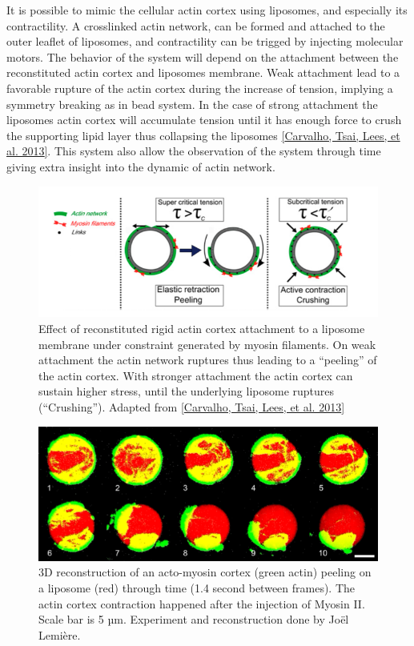 \documentclass[A4paperpaper,11pt,english]{sphinxmanual}
\begin{document}
It is possible to mimic the cellular actin cortex using liposomes, and especially
its contractility. A crosslinked actin network, can be formed and attached to
the outer leaflet of liposomes, and contractility can be trigged by injecting
molecular motors. The behavior of the system will depend on the attachment
between the reconstituted actin cortex and liposomes membrane.  Weak attachment
lead to a favorable rupture of the actin cortex during the increase of tension,
implying a symmetry breaking as in bead system.  In the case of strong
attachment the liposomes actin cortex will accumulate tension until it has
enough force to crush the supporting lipid layer thus collapsing the liposomes
{\hyperref[parts/part1:carvalho2013]{{[}Carvalho, Tsai, Lees,  et al.  2013{]}}}. This system also allow the observation of the system
through time giving extra insight into the dynamic of actin network.
\begin{figure}[htbp]
\centering
\capstart

\includegraphics[width=0.800\linewidth]{joel-2-11.png}
\caption{Effect of reconstituted rigid actin cortex attachment to a liposome
membrane under constraint generated by myosin filaments. On weak attachment
the actin network ruptures thus leading to a ``peeling'' of the actin cortex.
With stronger attachment the actin cortex can sustain higher stress, until
the underlying liposome ruptures (``Crushing''). Adapted from
{\hyperref[parts/part1:carvalho2013]{{[}Carvalho, Tsai, Lees,  et al.  2013{]}}}}\end{figure}
\begin{figure}[htbp]
\centering
\capstart

\includegraphics[width=0.900\linewidth]{joel-5-12.png}
\caption{3D reconstruction of an acto-myosin cortex (green actin) peeling on a
liposome (red) through time (1.4 second between frames). The actin cortex
contraction happened after the injection of Myosin II. Scale bar is 5 µm.
Experiment and reconstruction done by Joël Lemière.}\end{figure}
\end{document}
